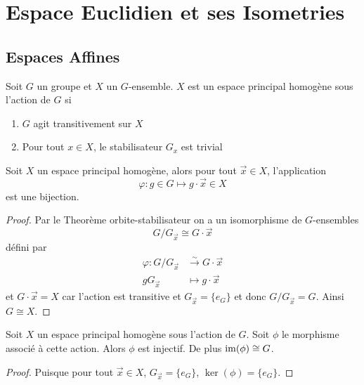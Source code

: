 \section{Espace Euclidien et ses Isometries}

\subsection{Espaces Affines}

\begin{definition}
	Soit $G$ un groupe et $X$ un $G$-ensemble. $X$ est un espace principal
	homogène sous l'action de $G$ si
	\begin{enumerate}
		\item $G$ agit transitivement sur $X$
		\item Pour tout $x \in X$, le stabilisateur $G_x$ est trivial
	\end{enumerate}
\end{definition}

\begin{proposition}
	\label{prop:sous-espace-orbite}
	Soit $X$ un espace principal homogène, alors pour tout $\vec{x} \in X$,
	l'application
	\begin{equation*}
		\varphi : g \in G \mapsto g\cdot\vec{x} \in X
	\end{equation*}
	est une bijection.
\end{proposition}

\begin{proof}
	Par le Theorème orbite-stabilisateur on a un isomorphisme de $G$-ensembles
	\begin{equation*}
		G/G_\vec{x} \cong G\cdot\vec{x}
	\end{equation*}
	défini par
	\begin{align*}
		\varphi : G/G_\vec{x} &\xrightarrow{\sim}  G\cdot\vec{x}\\
		gG_\vec{x} &\mapsto g \cdot \vec{x}
	\end{align*}
	et $G\cdot\vec{x} = X$ car l'action est transitive et $G_\vec{x} = \{e_G\}$
	et donc $G/G_\vec{x} = G$. Ainsi $G \cong X$.
\end{proof}

\begin{proposition}
	Soit $X$ un espace principal homogène sous l'action de $G$. Soit $\phi$ le
	morphisme associé à cette action. Alors $\phi$ est injectif.  De plus
	$\operatorname{im}(\phi) \cong G$.
\end{proposition}

\begin{proof}
	Puisque pour tout $\vec{x} \in X$, $G_\vec{x} = \{e_G\}$, $\ker(\phi) =
	\{e_G\}$.
\end{proof}

